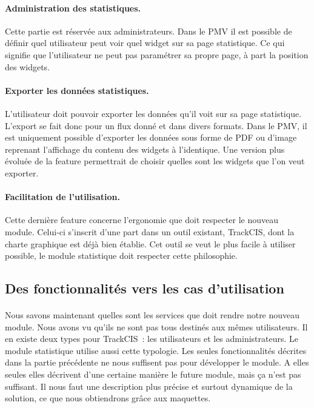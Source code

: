 			\paragraph{Administration des statistiques.}
			Cette partie est réservée aux administrateurs. Dans le
			PMV il est possible de définir quel utilisateur peut voir quel widget sur sa
			page statistique. Ce qui signifie que l'utilisateur ne peut pas paramétrer
			sa propre page, à part la position des widgets.
			
			\paragraph{Exporter les données statistiques.}
			L'utilisateur doit pouvoir exporter les données qu'il voit sur sa page
			statistique. L'export se fait donc pour un flux donné et dans divers formats.
			Dans le PMV, il est uniquement possible d'exporter les données sous forme de
			PDF ou d'image reprenant l'affichage du contenu des widgets à l'identique.
			Une version plus évoluée de la feature permettrait de choisir quelles sont
			les widgets que l'on veut exporter.
			
			\paragraph{Facilitation de l’utilisation.}
			Cette dernière feature concerne l'ergonomie que doit respecter le nouveau
			module. Celui-ci s'inscrit d'une part dans un outil existant, TrackCIS, dont
			la charte graphique est déjà bien établie. Cet outil se veut le plus facile à
			utiliser possible, le module statistique doit respecter cette philosophie.
	
	\subsection{Des fonctionnalités vers les cas d'utilisation}
		\paragraph{}
		Nous savons maintenant quelles sont les services que doit rendre notre nouveau
		module. Nous avons vu qu'ils ne sont pas tous destinés aux mêmes utilisateurs.
		Il en existe deux types pour TrackCIS~: les utilisateurs et les
		administrateurs. Le module statistique utilise aussi cette typologie. Les
		seules fonctionnalités décrites dans la partie précédente ne nous suffisent
		pas pour développer le module. A elles seules elles décrivent d'une certaine
		manière le future module, mais ça n'est pas suffisant. Il nous faut une
		description plus précise et surtout dynamique de la solution, ce que nous
		obtiendrons grâce aux maquettes.
		
